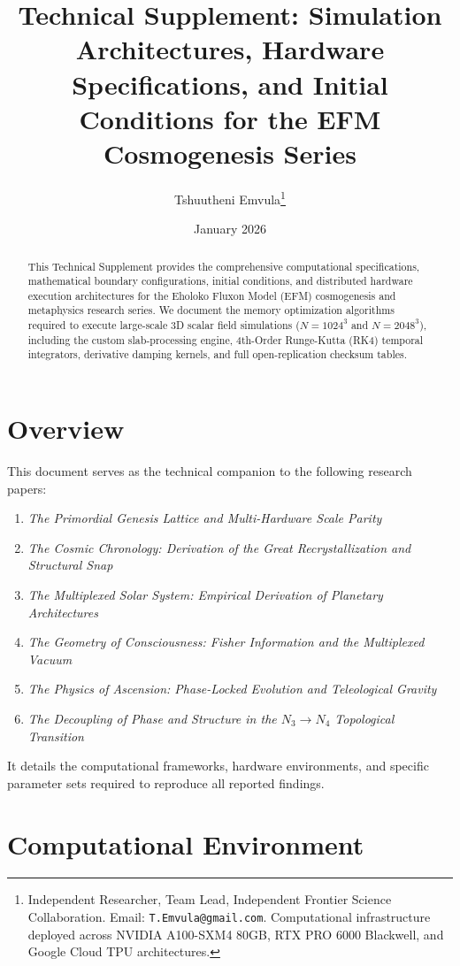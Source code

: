 \documentclass[11pt, twoside]{article}
\title{\textbf{Technical Supplement: Simulation Architectures, Hardware Specifications, and Initial Conditions for the EFM Cosmogenesis Series}}
\author{Tshuutheni Emvula\thanks{Independent Researcher, Team Lead, Independent Frontier Science Collaboration. Email: \texttt{T.Emvula@gmail.com}. Computational infrastructure deployed across NVIDIA A100-SXM4 80GB, RTX PRO 6000 Blackwell, and Google Cloud TPU architectures.}}
\date{January 2026}
\begin{document}
\maketitle
\thispagestyle{empty}

\begin{abstract}
This Technical Supplement provides the comprehensive computational specifications, mathematical boundary configurations, initial conditions, and distributed hardware execution architectures for the Eholoko Fluxon Model (EFM) cosmogenesis and metaphysics research series. We document the memory optimization algorithms required to execute large-scale 3D scalar field simulations ($N=1024^3$ and $N=2048^3$), including the custom slab-processing engine, 4th-Order Runge-Kutta (RK4) temporal integrators, derivative damping kernels, and full open-replication checksum tables.
\end{abstract}

\clearpage
\tableofcontents
\clearpage

\section{Overview}
This document serves as the technical companion to the following research papers:
\begin{enumerate}
    \item \textit{The Primordial Genesis Lattice and Multi-Hardware Scale Parity}
    \item \textit{The Cosmic Chronology: Derivation of the Great Recrystallization and Structural Snap}
    \item \textit{The Multiplexed Solar System: Empirical Derivation of Planetary Architectures}
    \item \textit{The Geometry of Consciousness: Fisher Information and the Multiplexed Vacuum}
    \item \textit{The Physics of Ascension: Phase-Locked Evolution and Teleological Gravity}
    \item \textit{The Decoupling of Phase and Structure in the $N_3 \to N_4$ Topological Transition}
\end{enumerate}
It details the computational frameworks, hardware environments, and specific parameter sets required to reproduce all reported findings.

\section{Computational Environment}
\end{document}
